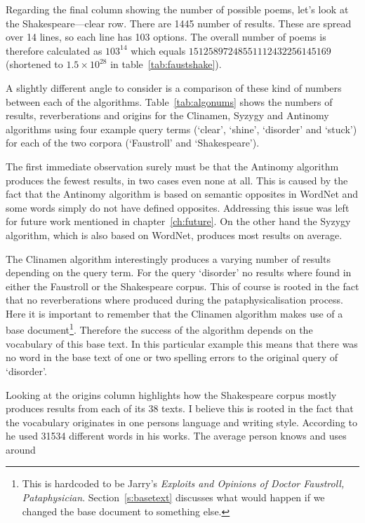 Regarding the final column showing the number of possible poems, let's look at the Shakespeare---clear row. There are 1445 number of results. These are spread over 14 lines, so each line has 103 options. The overall number of poems is therefore calculated as $103^{14}$ which equals $15125897248551112432256145169$ (shortened to $1.5 \times 10^{28}$ in table~\ref{tab:faustshake}).

\spirals

A slightly different angle to consider is a comparison of these kind of numbers between each of the algorithms. Table~\ref{tab:algonums} shows the numbers of results, reverberations and origins for the Clinamen, Syzygy and Antinomy algorithms using four example query terms (`clear', `shine', `disorder' and `stuck') for each of the two corpora (`Faustroll' and `Shakespeare').

The first immediate observation surely must be that the Antinomy algorithm produces the fewest results, in two cases even none at all. This is caused by the fact that the Antinomy algorithm is based on semantic opposites in WordNet and some words simply do not have defined opposites. Addressing this issue was left for future work mentioned in chapter~\ref{ch:future}. On the other hand the Syzygy algorithm, which is also based on WordNet, produces most results on average.

The Clinamen algorithm interestingly produces a varying number of results depending on the query term. For the query `disorder' no results where found in either the Faustroll or the Shakespeare corpus. This of course is rooted in the fact that no reverberations where produced during the pataphysicalisation process. Here it is important to remember that the Clinamen algorithm makes use of a base document\footnote{This is hardcoded to be Jarry's \textit{Exploits and Opinions of Doctor Faustroll, Pataphysician}. Section~\ref{s:basetext} discusses what would happen if we changed the base document to something else.}. Therefore the success of the algorithm depends on the vocabulary of this base text. In this particular example this means that there was no word in the base text of one or two spelling errors to the original query of `disorder'.

Looking at the origins column highlights how the Shakespeare corpus mostly produces results from each of its 38 texts. I believe this is rooted in the fact that the vocabulary originates in one persons language and writing style. According to \autocite{Efron1976} he used 31534 different words in his works. The average person knows and uses around 

